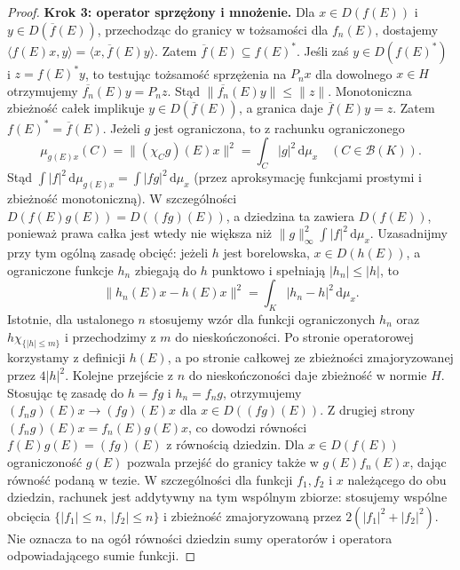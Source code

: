 \begin{proof}
\textbf{Krok 3: operator sprzężony i mnożenie.}
Dla $x\in D(f(E))$ i $y\in D(\overline f(E))$,
przechodząc do granicy w tożsamości dla $f_n(E)$,
dostajemy $\langle f(E)x,y\rangle
=\langle x,\overline f(E)y\rangle$.
Zatem $\overline f(E)\subseteq f(E)^*$.
Jeśli zaś $y\in D(f(E)^*)$ i $z=f(E)^*y$, to
testując tożsamość sprzężenia na $P_nx$ dla dowolnego
$x\in H$ otrzymujemy
$\overline{f_n}(E)y=P_nz$.
Stąd $\|\overline{f_n}(E)y\|\le\|z\|$.
Monotoniczna zbieżność całek implikuje
$y\in D(\overline f(E))$, a granica daje
$\overline f(E)y=z$. Zatem $f(E)^*=\overline f(E)$.
Jeżeli $g$ jest ograniczona, to z rachunku ograniczonego
\[
 \mu_{g(E)x}(C)=\|(\chi_Cg)(E)x\|^2
 =\int_C |g|^2\,\mathrm d\mu_x
 \quad(C\in\mathcal B(K)).
\]
Stąd $\int|f|^2\,\mathrm d\mu_{g(E)x}=\int|fg|^2\,\mathrm d\mu_x$
(przez aproksymację funkcjami prostymi i zbieżność monotoniczną).
W szczególności $D(f(E)g(E))=D((fg)(E))$, a dziedzina ta zawiera
$D(f(E))$, ponieważ prawa całka jest wtedy nie większa niż
$\|g\|_\infty^2\int|f|^2\,\mathrm d\mu_x$.
Uzasadnijmy przy tym ogólną zasadę obcięć: jeżeli $h$ jest
borelowska, $x\in D(h(E))$, a ograniczone funkcje $h_n$
zbiegają do $h$ punktowo i spełniają $|h_n|\le |h|$, to
\[
 \|h_n(E)x-h(E)x\|^2=\int_K|h_n-h|^2\,\mathrm d\mu_x.
\]
Istotnie, dla ustalonego $n$ stosujemy wzór dla funkcji
ograniczonych $h_n$ oraz $h\chi_{\{|h|\le m\}}$ i przechodzimy
z $m$ do nieskończoności. Po stronie operatorowej korzystamy
z definicji $h(E)$, a po stronie całkowej ze zbieżności
zmajoryzowanej przez $4|h|^2$. Kolejne przejście z $n$ do
nieskończoności daje zbieżność w normie $H$.
Stosując tę zasadę do $h=fg$ i $h_n=f_ng$, otrzymujemy
$(f_ng)(E)x\to(fg)(E)x$ dla $x\in D((fg)(E))$. Z drugiej strony $(f_ng)(E)x=f_n(E)g(E)x$,
co dowodzi równości $f(E)g(E)=(fg)(E)$ z równością dziedzin.
Dla $x\in D(f(E))$ ograniczoność $g(E)$ pozwala przejść do granicy
także w $g(E)f_n(E)x$, dając równość podaną w tezie.
W szczególności dla funkcji $f_1,f_2$ i $x$ należącego do obu
dziedzin, rachunek jest addytywny na tym wspólnym zbiorze:
stosujemy wspólne obcięcia $\{|f_1|\le n,\ |f_2|\le n\}$ i zbieżność
zmajoryzowaną przez $2(|f_1|^2+|f_2|^2)$.
Nie oznacza to na ogół równości dziedzin sumy operatorów
i operatora odpowiadającego sumie funkcji.
\end{proof}

